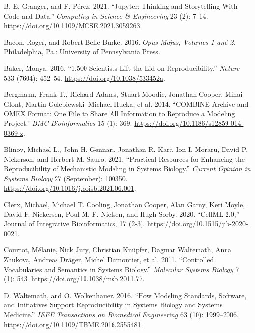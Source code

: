 \documentclass[
  a4paper,
]{scrartcl}
\newlength{\cslhangindent}
\newenvironment{CSLReferences}[2] %
 {\begin{list}{}{%
  \setlength{\itemindent}{0pt}
  \setlength{\leftmargin}{0pt}
  \setlength{\parsep}{0pt}
  \ifodd #1
   \setlength{\leftmargin}{\cslhangindent}
   \setlength{\itemindent}{-1\cslhangindent}
  \fi
  \setlength{\itemsep}{#2\baselineskip}}}
 {\end{list}}
\begin{document}
\label{refs}
\begin{CSLReferences}{1}{0}
B. E. Granger, and F. Pérez. 2021. {``Jupyter: {Thinking} and
{Storytelling} {With} {Code} and {Data}.''} \emph{Computing in Science
\& Engineering} 23 (2): 7--14.
\url{https://doi.org/10.1109/MCSE.2021.3059263}.

Bacon, Roger, and Robert Belle Burke. 2016. \emph{Opus {Majus},
{Volumes} 1 and 2}. Philadelphia, Pa.: University of Pennsylvania Press.

Baker, Monya. 2016. {``1,500 Scientists Lift the Lid on
Reproducibility.''} \emph{Nature} 533 (7604): 452--54.
\url{https://doi.org/10.1038/533452a}.

Bergmann, Frank T., Richard Adams, Stuart Moodie, Jonathan Cooper, Mihai
Glont, Martin Golebiewski, Michael Hucka, et al. 2014. {``{COMBINE}
Archive and {OMEX} Format: One File to Share All Information to
Reproduce a Modeling Project.''} \emph{BMC Bioinformatics} 15 (1): 369.
\url{https://doi.org/10.1186/s12859-014-0369-z}.

Blinov, Michael L., John H. Gennari, Jonathan R. Karr, Ion I. Moraru,
David P. Nickerson, and Herbert M. Sauro. 2021. {``Practical Resources
for Enhancing the Reproducibility of Mechanistic Modeling in Systems
Biology.''} \emph{Current Opinion in Systems Biology} 27 (September):
100350. \url{https://doi.org/10.1016/j.coisb.2021.06.001}.

Clerx, Michael, Michael T. Cooling, Jonathan Cooper, Alan Garny, Keri
Moyle, David P. Nickerson, Poul M. F. Nielsen, and Hugh Sorby. 2020.
{``{CellML} 2.0,''} Journal of {Integrative} {Bioinformatics}, 17 (2-3).
\url{https://doi.org/10.1515/jib-2020-0021}.

Courtot, Mélanie, Nick Juty, Christian Knüpfer, Dagmar Waltemath, Anna
Zhukova, Andreas Dräger, Michel Dumontier, et al. 2011. {``Controlled
Vocabularies and Semantics in Systems Biology.''} \emph{Molecular
Systems Biology} 7 (1): 543. \url{https://doi.org/10.1038/msb.2011.77}.

D. Waltemath, and O. Wolkenhauer. 2016. {``How {Modeling} {Standards},
{Software}, and {Initiatives} {Support} {Reproducibility} in {Systems}
{Biology} and {Systems} {Medicine}.''} \emph{IEEE Transactions on
Biomedical Engineering} 63 (10): 1999--2006.
\url{https://doi.org/10.1109/TBME.2016.2555481}.


\end{CSLReferences}
\end{document}
